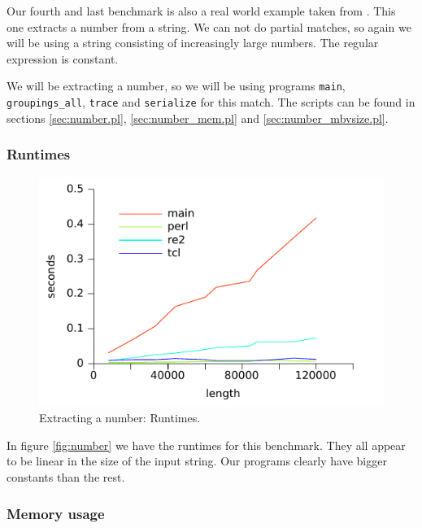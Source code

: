 Our fourth and last benchmark is also a real world example taken from
\cite{veanes}. This one extracts a number from a string. We can not do
partial matches, so again we will be using a string consisting of
increasingly large numbers. The regular expression is constant.

We will be extracting a number, so we will be using programs
\texttt{main}, \texttt{groupings\_all}, \texttt{trace} and
\texttt{serialize} for this match. The scripts can be found in
sections \vref{sec:number.pl}, \vref{sec:number_mem.pl} and
\vref{sec:number_mbvsize.pl}.


\subsubsection*{Runtimes}

\begin{figure}
\centering
\includegraphics{benchmarks/number.pdf}
\caption{Extracting a number: Runtimes.}
\label{fig:number}
\end{figure}

In figure \vref{fig:number} we have the runtimes for this
benchmark. They all appear to be linear in the size of the input
string. Our programs clearly have bigger constants than the rest. 


\subsubsection*{Memory usage}


